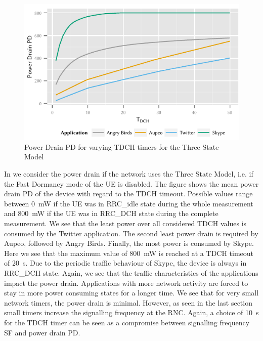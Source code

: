 \begin{figure}
	\centering
	\includegraphics{network/network_traces/numerical_results/figures/3_state_tdch_vs_power_drain}
	\caption{Power Drain \gls{PD} for varying \gls{TDCH} timers for the Three State Model}\label{fig:network:network_traces:numerical_results:three_states:power_drain}
\end{figure}
In  we consider the power drain if the network uses the Three State Model, i.e. if the Fast Dormancy mode of the \gls{UE} is disabled.
The figure shows the mean power drain \gls{PD} of the device with regard to the \gls{TDCH} timeout.
Possible values range between \SI{0}{\milli\watt} if the \gls{UE} was in \gls{RRC_idle} state during the whole measurement and \SI{800}{\milli\watt} if the \gls{UE} was in \gls{RRC_DCH} state during the complete measurement.
We see that the least power over all considered \gls{TDCH} values is consumed by the Twitter application.
The second least power drain is required by Aupeo, followed by Angry Birds.
Finally, the most power is consumed by Skype.
Here we see that the maximum value of \SI{800}{\milli\watt} is reached at a \gls{TDCH} timeout of \SI{20}{\second}.
Due to the periodic traffic behaviour of Skype, the device is always in \gls{RRC_DCH} state.
Again, we see that the traffic characteristics of the applications impact the power drain.
Applications with more network activity are forced to stay in more power consuming states for a longer time.
We see that for very small network timers, the power drain is minimal.
However, as seen in the last section small timers increase the signalling frequency at the \gls{RNC}.
Again, a choice of \SI{10}{\second} for the \gls{TDCH} timer can be seen as a compromise between signalling frequency \gls{SF} and power drain \gls{PD}.


